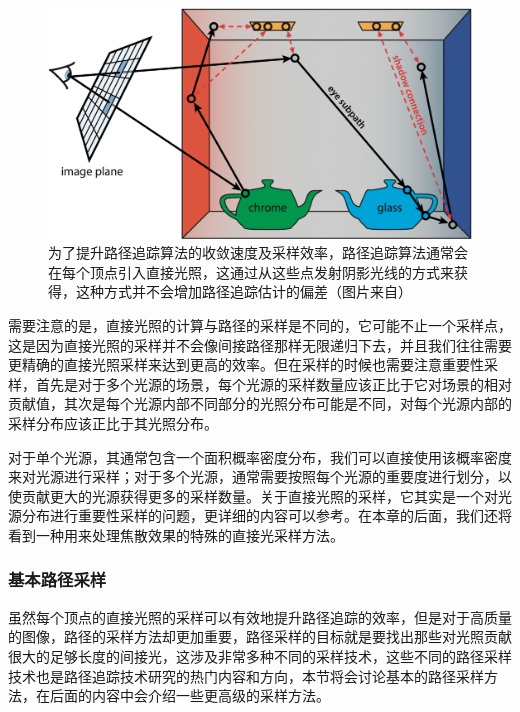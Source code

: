 \begin{figure}
	\includegraphics[width=1.0\textwidth]{figures/pt/direct-indirect}
	\caption{为了提升路径追踪算法的收敛速度及采样效率，路径追踪算法通常会在每个顶点引入直接光照，这通过从这些点发射阴影光线的方式来获得，这种方式并不会增加路径追踪估计的偏差（图片来自\cite{a:ThePathtoPath-TracedMovies}）}
	\label{f:pt-shadow-rays}
\end{figure}

需要注意的是，直接光照的计算与路径的采样是不同的，它可能不止一个采样点，这是因为直接光照的采样并不会像间接路径那样无限递归下去，并且我们往往需要更精确的直接光照采样来达到更高的效率。但在采样的时候也需要注意重要性采样，首先是对于多个光源的场景，每个光源的采样数量应该正比于它对场景的相对贡献值，其次是每个光源内部不同部分的光照分布可能是不同，对每个光源内部的采样分布应该正比于其光照分布。

对于单个光源，其通常包含一个面积概率密度分布，我们可以直接使用该概率密度来对光源进行采样；对于多个光源，通常需要按照每个光源的重要度进行划分，以使贡献更大的光源获得更多的采样数量。关于直接光照的采样，它其实是一个对光源分布进行重要性采样的问题，更详细的内容可以参考\cite{b:AdvancedGlobalIllumination}。在本章的后面，我们还将看到一种用来处理焦散效果的特殊的直接光采样方法。






\subsubsection{基本路径采样}
虽然每个顶点的直接光照的采样可以有效地提升路径追踪的效率，但是对于高质量的图像，路径的采样方法却更加重要，路径采样的目标就是要找出那些对光照贡献很大的足够长度的间接光，这涉及非常多种不同的采样技术，这些不同的路径采样技术也是路径追踪技术研究的热门内容和方向，本节将会讨论基本的路径采样方法，在后面的内容中会介绍一些更高级的采样方法。

